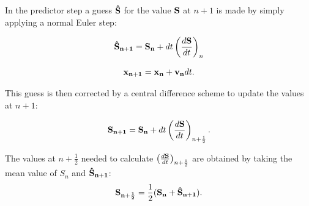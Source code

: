 \documentclass{report}
\begin{document}
In the predictor step a guess ${\bf \hat S}$ for the value ${\bf S}$ at $n+1$ is made by simply
applying a normal Euler step:

\begin{equation}
{\bf \hat S_{n+1}}={\bf S_n}+dt\left(\frac{d{\bf S}}{dt}\right)_n
\end{equation}

\begin{equation}
{\bf x_{n+1}}={\bf x_n}+ {\bf v_{n}}dt.
\end{equation}

This guess is then corrected by a central difference scheme to update the values at
$n+1$:

\begin{equation}
{\bf S_{n+1}}={\bf S_n}+dt\left(\frac{d{\bf S}}{dt}\right)_{n+\frac{1}{2}}.
\end{equation}

The values at $n+\frac{1}{2}$ needed to calculate
$\left(\frac{d{\bf S}}{dt}\right)_{n+\frac{1}{2}}$ are obtained by taking the mean value of
$S_n$ and ${\bf \hat S_{n+1}}$:
\begin{equation}
{\bf S_{n+\frac{1}{2}}}=\frac{1}{2}({\bf S_n}+{\bf \hat S_{n+1}}).
\end{equation}
\end{document}

